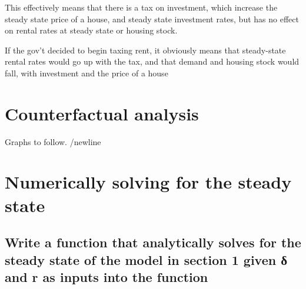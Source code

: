 \documentclass{article}\usepackage[]{graphicx}\usepackage[]{color}
\begin{document}
This effectively means that there is a tax on investment, which increase the steady state price of a house, and steady state investment rates, but has no effect on rental rates at steady state or housing stock. 

If the gov't decided to begin taxing rent, it obviously means that steady-state rental rates would go up with the tax, and that demand and housing stock would fall, with investment and the price of a house

\section{Counterfactual analysis}

Graphs to follow. /newline









\section{Numerically solving for the steady state}
\subsection{Write a function that analytically solves for the steady state of the model in section 1 given δ and r as inputs into the function}
\end{document}
